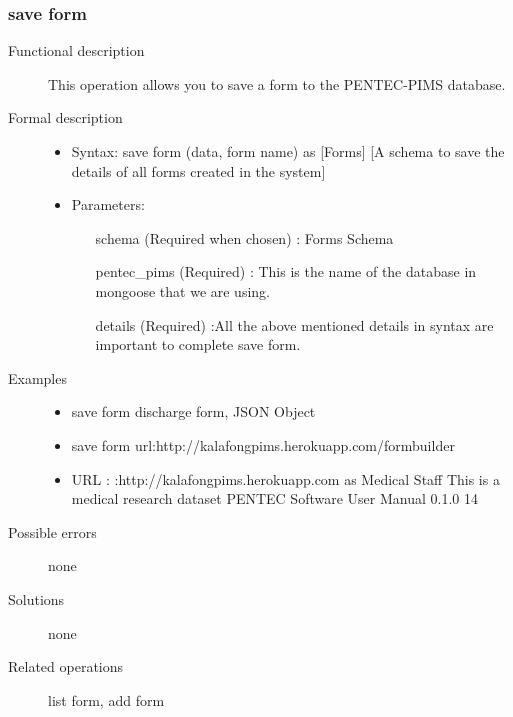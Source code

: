 \documentclass[14pt, a4paper]{article}
\begin{document}
	      
\subsubsection{save form}
\begin{description}
\item[Functional description] This operation allows you to save a form to the PENTEC-PIMS database.
\item [Formal description]\hfill
\begin{itemize}
	\item Syntax: save form (data, form name) as [Forms] [A schema to save the details of all forms created in the system]\\
	\item Parameters:
	\begin{itemize}
		\item [schema] (Required when chosen) : Forms Schema
		\item [pentec\_pims] (Required) : This is the name of the database in mongoose that we are using.
		\item [details] (Required) :All the above mentioned details in syntax are important to complete save form.
	\end{itemize}
\end{itemize}

\item[Examples]\hfill
\begin{itemize}
	\item save form discharge form, JSON Object
	\item save form url:http://kalafongpims.herokuapp.com/formbuilder
	\item URL : :http://kalafongpims.herokuapp.com as Medical Staff This is a medical research dataset
	PENTEC Software User Manual 0.1.0 14
\end{itemize}

\item[Possible errors]none
\item[Solutions] none
\item [Related operations] list form, add form
\end{description}
\end{document}
